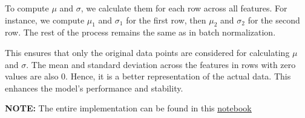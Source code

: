 To compute $\mu$ and $\sigma$, we calculate them for each row across all features. For instance, we compute $\mu_1$ and $\sigma_1$ for the first row, then $\mu_2$ and $\sigma_2$ for the second row. The rest of the process remains the same as in batch normalization.

This ensures that only the original data points are considered for calculating $\mu$ and $\sigma$. The mean and standard deviation across the features in rows with zero values are also 0. Hence, it is a better representation of the actual data. This enhances the model's performance and stability.

\textbf{NOTE:} The entire implementation can be found in this \underline{\href{https://colab.research.google.com/drive/1dJItP6qJuaUi4b-uDvZM9G_U6wCeXhbs?usp=sharing}{notebook}}